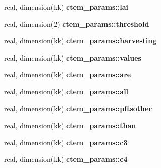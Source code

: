 \begin{DoxyCompactItemize}
\item 
\hypertarget{namespacectem__params_a0dadcfcefe37fc3113f1e6e775dfe285}{}real, dimension(kk) {\bfseries ctem\+\_\+params\+::lai}\label{namespacectem__params_a0dadcfcefe37fc3113f1e6e775dfe285}

\item 
\hypertarget{namespacectem__params_a890c124d3e1fef6db726124deac19d5b}{}real, dimension(2) {\bfseries ctem\+\_\+params\+::threshold}\label{namespacectem__params_a890c124d3e1fef6db726124deac19d5b}

\item 
\hypertarget{namespacectem__params_a1c0e4c227ed069b7a4131cfae462c540}{}real, dimension(kk) {\bfseries ctem\+\_\+params\+::harvesting}\label{namespacectem__params_a1c0e4c227ed069b7a4131cfae462c540}

\item 
\hypertarget{namespacectem__params_aa76b81cc8bba155196528c5fdf124038}{}real, dimension(kk) {\bfseries ctem\+\_\+params\+::values}\label{namespacectem__params_aa76b81cc8bba155196528c5fdf124038}

\item 
\hypertarget{namespacectem__params_a08b14289f1723b6ccea79f03cf47e353}{}real, dimension(kk) {\bfseries ctem\+\_\+params\+::are}\label{namespacectem__params_a08b14289f1723b6ccea79f03cf47e353}

\item 
\hypertarget{namespacectem__params_a9163d12d78f8bb716ce809f2134f74c6}{}real, dimension(kk) {\bfseries ctem\+\_\+params\+::all}\label{namespacectem__params_a9163d12d78f8bb716ce809f2134f74c6}

\item 
\hypertarget{namespacectem__params_a8eb9b4db74e5fb4aad1032f9b1ca6b5e}{}real, dimension(kk) {\bfseries ctem\+\_\+params\+::pftsother}\label{namespacectem__params_a8eb9b4db74e5fb4aad1032f9b1ca6b5e}

\item 
\hypertarget{namespacectem__params_ae381fddf364f12c993b42cb625872387}{}real, dimension(kk) {\bfseries ctem\+\_\+params\+::than}\label{namespacectem__params_ae381fddf364f12c993b42cb625872387}

\item 
\hypertarget{namespacectem__params_a49138bbf97b6cb94b3e215006c42ef8e}{}real, dimension(kk) {\bfseries ctem\+\_\+params\+::c3}\label{namespacectem__params_a49138bbf97b6cb94b3e215006c42ef8e}

\item 
\hypertarget{namespacectem__params_ae9164d620780a65626ed6d52077b2697}{}real, dimension(kk) {\bfseries ctem\+\_\+params\+::c4}\label{namespacectem__params_ae9164d620780a65626ed6d52077b2697}


\end{DoxyCompactItemize}
